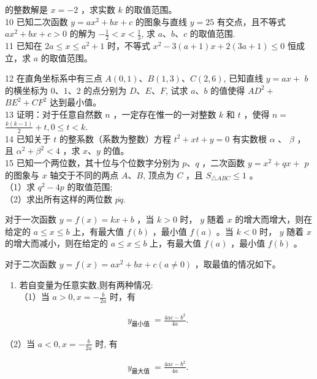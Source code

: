\documentclass[10pt]{article}
\begin{document}
的整数解是 $x=-2$ ，求实数 $k$ 的取值范围。\\
10 已知二次函数 $y=a x^{2}+b x+c$ 的图象与直线 $y=25$ 有交点，且不等式 $a x^{2}+b x+c>0$ 的解为 $-\frac{1}{2}<x<\frac{1}{3}$, 求 $a 、 b 、 c$ 的取值范围.\\
11 已知在 $2 a \leqslant x \leqslant a^{2}+1$ 时，不等式 $x^{2}-3(a+1) x+2(3 a+1) \leqslant 0$ 恒成立，求 $a$ 的取值范围。

12 在直角坐标系中有三点 $A(0,1) 、 B(1,3) 、 C(2,6)$, 已知直线 $y=a x+$ $b$ 的横坐标为 $0 、 1 、 2$ 的点分别为 $D 、 E 、 F$, 试求 $a 、 b$ 的值使得 $A D^{2}+$ $B E^{2}+C F^{2}$ 达到最小值。\\
13 证明：对于任意自然数 $n$ ，一定存在惟一的一对整数 $k$ 和 $t$ ，使得 $n=$ $\frac{k(k-1)}{2}+t, 0 \leqslant t<k$.\\
14 已知关于 $t$ 的整系数（系数为整数）方程 $t^{2}+x t+y=0$ 有实数根 $\alpha$ 、 $\beta$ ，且 $\alpha^{2}+\beta^{2}<4$ ，求 $x 、 y$ 的值。\\
15 已知一个两位数，其十位与个位数字分别为 $p 、 q$ ，二次函数 $y=x^{2}+q x+$ $p$ 的图象与 $x$ 轴交于不同的两点 $A 、 B$, 顶点为 $C$ ，且 $S_{\triangle A B C} \leqslant 1$ 。\\
（1）求 $q^{2}-4 p$ 的取值范围;\\
（2）求出所有这样的两位数 $\overline{p q}$.

对于一次函数 $y=f(x)=k x+b$ ，当 $k>0$ 时， $y$ 随着 $x$ 的增大而增大，则在给定的 $a \leqslant x \leqslant b$ 上，有最大值 $f(b)$ ，最小值 $f(a)$ 。当 $k<0$ 时， $y$ 随着 $x$的增大而减小，则在给定的 $a \leqslant x \leqslant b$ 上，有最大值 $f(a)$ ，最小值 $f(b)$ 。

对于二次函数 $y=f(x)=a x^{2}+b x+c(a \neq 0)$ ，取最值的情况如下。

\begin{enumerate}
  \item 若自变量为任意实数,则有两种情况:\\
（1）当 $a>0, x=-\frac{b}{2 a}$ 时，有
\end{enumerate}

\begin{align*}
y_{\text {最小值 }}=\frac{4 a c-b^{2}}{4 a} \text {. }
\end{align*}

（2）当 $a<0, x=-\frac{b}{2 a}$ 时, 有

\begin{align*}
y_{\text {最大值 }}=\frac{4 a c-b^{2}}{4 a} \text {. }
\end{align*}
\end{document}
